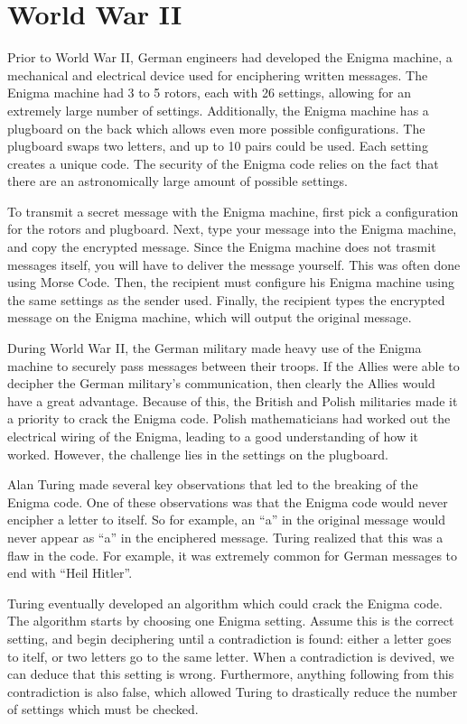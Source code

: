 \documentclass[12pt]{article}
\theoremstyle{mystyle}
\begin{document}
\section{World War II}


Prior to World War II, German engineers had developed the Enigma machine, a
mechanical and electrical device used for enciphering written messages.
The Enigma machine had 3 to 5 rotors, each with 26 settings, allowing for an
extremely large number of settings. Additionally, the Enigma machine has a
plugboard on the back which allows even more possible configurations. The
plugboard swaps two letters, and up to 10 pairs could be used. Each setting
creates a unique code. The security of the Enigma code relies on the fact that
there are an astronomically large amount of possible settings.

To transmit a secret message with the Enigma machine, first pick a
configuration for the rotors and plugboard. Next, type your message into the
Enigma machine, and copy the encrypted message. Since the Enigma machine does
not trasmit messages itself, you will have to deliver the message yourself. This
was often done using Morse Code. Then, the recipient must configure his Enigma
machine using the same settings as the sender used. Finally, the recipient types
the encrypted message on the Enigma machine, which will output the original
message.

During World War II, the German military made heavy use of the Enigma machine to
securely pass messages between their troops. If the Allies were able to decipher
the German military's communication, then clearly the Allies would have a great
advantage. Because of this, the British and Polish militaries made it a priority
to crack the Enigma code. Polish mathematicians had worked out the electrical
wiring of the Enigma, leading to a good understanding of how it worked. 
However, the challenge lies in the settings on the plugboard.

Alan Turing made several key observations that led to the breaking of the Enigma
code. One of these observations was that the Enigma code would never encipher a 
letter to itself. So for example, an ``a'' in the original message would never
appear as ``a'' in the enciphered message. Turing realized that this was a flaw
in the code.
    For example, it was extremely common for German messages to end with ``Heil
Hitler''.

Turing eventually developed an algorithm which could crack the Enigma code. The 
algorithm starts by choosing one Enigma setting. Assume this is the correct
setting, and begin deciphering until a contradiction is found: either a letter
goes to itelf, or two letters go to the same letter. When a contradiction is
devived, we can deduce that this setting is wrong. Furthermore, anything
following from this contradiction is also false, which allowed Turing to
drastically reduce the number of settings which must be checked.
\end{document}
